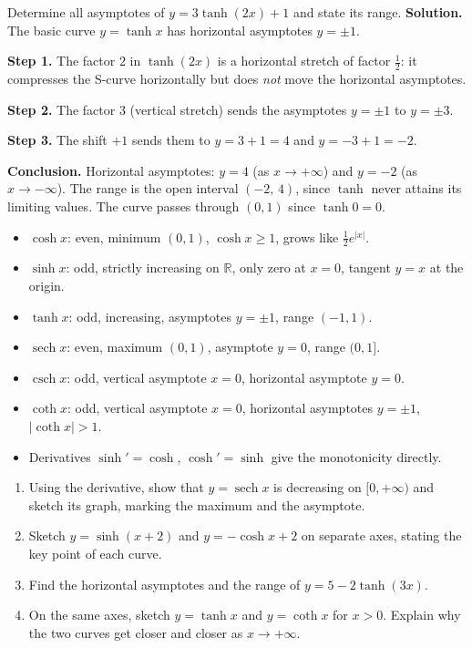 \documentclass[11pt]{article}
\begin{document}
\begin{exoresolu}
Determine all asymptotes of $y = 3\tanh(2x) + 1$ and state its range.
\tcblower
\textbf{Solution.} The basic curve $y=\tanh x$ has horizontal asymptotes $y=\pm 1$.

\textbf{Step 1.} The factor $2$ in $\tanh(2x)$ is a horizontal stretch of factor $\tfrac12$: it compresses the S-curve horizontally but does \emph{not} move the horizontal asymptotes.

\textbf{Step 2.} The factor $3$ (vertical stretch) sends the asymptotes $y=\pm1$ to $y=\pm 3$.

\textbf{Step 3.} The shift $+1$ sends them to $y = 3+1=4$ and $y=-3+1=-2$.

\textbf{Conclusion.} Horizontal asymptotes: $y=4$ (as $x\to+\infty$) and $y=-2$ (as $x\to-\infty$). The range is the open interval $(-2,\,4)$, since $\tanh$ never attains its limiting values. The curve passes through $(0,1)$ since $\tanh 0 = 0$.
\end{exoresolu}

\begin{aretenir}
\begin{itemize}
\item $\cosh x$: even, minimum $(0,1)$, $\cosh x \ge 1$, grows like $\tfrac12 e^{|x|}$.
\item $\sinh x$: odd, strictly increasing on $\mathbb{R}$, only zero at $x=0$, tangent $y=x$ at the origin.
\item $\tanh x$: odd, increasing, asymptotes $y=\pm 1$, range $(-1,1)$.
\item $\operatorname{sech} x$: even, maximum $(0,1)$, asymptote $y=0$, range $(0,1]$.
\item $\operatorname{csch} x$: odd, vertical asymptote $x=0$, horizontal asymptote $y=0$.
\item $\coth x$: odd, vertical asymptote $x=0$, horizontal asymptotes $y=\pm1$, $|\coth x|>1$.
\item Derivatives $\sinh'=\cosh$, $\cosh'=\sinh$ give the monotonicity directly.
\end{itemize}
\end{aretenir}

\begin{exercice}
\begin{enumerate}
\item Using the derivative, show that $y=\operatorname{sech} x$ is decreasing on $[0,+\infty)$ and sketch its graph, marking the maximum and the asymptote.
\item Sketch $y = \sinh(x+2)$ and $y = -\cosh x + 2$ on separate axes, stating the key point of each curve.
\item Find the horizontal asymptotes and the range of $y = 5 - 2\tanh(3x)$.
\item On the same axes, sketch $y=\tanh x$ and $y=\coth x$ for $x>0$. Explain why the two curves get closer and closer as $x\to+\infty$.
\end{enumerate}
\end{exercice}
\end{document}
